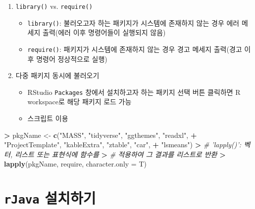 \documentclass[12pt,a4paper]{book}
\newenvironment{Shaded}{\begin{snugshade}}{\end{snugshade}}
\newcommand{\KeywordTok}[1]{\textcolor[rgb]{0.13,0.29,0.53}{\textbf{#1}}}
\newcommand{\DataTypeTok}[1]{\textcolor[rgb]{0.13,0.29,0.53}{#1}}
\newcommand{\StringTok}[1]{\textcolor[rgb]{0.31,0.60,0.02}{#1}}
\newcommand{\CommentTok}[1]{\textcolor[rgb]{0.56,0.35,0.01}{\textit{#1}}}
\newcommand{\OperatorTok}[1]{\textcolor[rgb]{0.81,0.36,0.00}{\textbf{#1}}}
\newcommand{\ErrorTok}[1]{\textcolor[rgb]{0.64,0.00,0.00}{\textbf{#1}}}
\newcommand{\NormalTok}[1]{#1}
\providecommand{\tightlist}{%
  \setlength{\itemsep}{0pt}\setlength{\parskip}{0pt}}
\theoremstyle{definition}
\theoremstyle{definition}
\theoremstyle{definition}
\theoremstyle{remark}
\begin{document}
\begin{enumerate}
\def\labelenumi{\arabic{enumi}.}
\tightlist
\item
  \texttt{library()} vs. \texttt{require()}

  \begin{itemize}
  \tightlist
  \item
    \texttt{library()}: 불러오고자 하는 패키지가 시스템에 존재하지 않는
    경우 에러 메세지 출력(에러 이후 명령어들이 실행되지 않음)
  \item
    \texttt{require()}: 패키지가 시스템에 존재하지 않는 경우 경고 메세지
    출력(경고 이후 명령어 정상적으로 실행)
  \end{itemize}
\item
  다중 패키지 동시에 불러오기

  \begin{itemize}
  \tightlist
  \item
    RStudio \texttt{Packages} 창에서 설치하고자 하는 패키지 선택 버튼
    클릭하면 R workspace로 해당 패키지 로드 가능
  \item
    스크립트 이용
  \end{itemize}
\end{enumerate}

\begin{Shaded}
\begin{Highlighting}[]
\OperatorTok{>}\StringTok{ }\NormalTok{pkgName <-}\StringTok{ }\KeywordTok{c}\NormalTok{(}\StringTok{"MASS"}\NormalTok{, }\StringTok{"tidyverse"}\NormalTok{, }\StringTok{"ggthemes"}\NormalTok{, }\StringTok{"readxl"}\NormalTok{, }
\OperatorTok{+}\StringTok{     "ProjectTemplate"}\NormalTok{, }\StringTok{"kableExtra"}\NormalTok{, }\StringTok{"ztable"}\NormalTok{, }\StringTok{"car"}\NormalTok{, }
\OperatorTok{+}\StringTok{     "lsmeans"}\NormalTok{)}
\OperatorTok{>}\StringTok{ }\CommentTok{# 'lapply()': 벡터, 리스트 또는 표현식에 함수를}
\ErrorTok{>}\StringTok{ }\CommentTok{# 적용하여 그 결과를 리스트로 반환}
\ErrorTok{>}\StringTok{ }\KeywordTok{lapply}\NormalTok{(pkgName, require, }\DataTypeTok{character.only =}\NormalTok{ T)}
\end{Highlighting}
\end{Shaded}

\section{\texorpdfstring{\texttt{rJava}
설치하기}{rJava 설치하기}}\label{rjava-}
\end{document}
